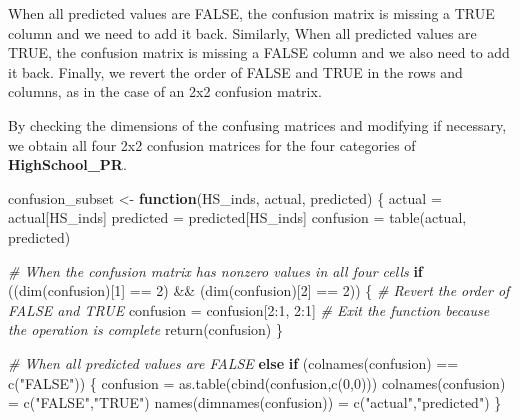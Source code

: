 \documentclass[
]{article}
\newenvironment{Shaded}{\begin{snugshade}}{\end{snugshade}}
\newcommand{\CommentTok}[1]{\textcolor[rgb]{0.56,0.35,0.01}{\textit{#1}}}
\newcommand{\ControlFlowTok}[1]{\textcolor[rgb]{0.13,0.29,0.53}{\textbf{#1}}}
\newcommand{\DecValTok}[1]{\textcolor[rgb]{0.00,0.00,0.81}{#1}}
\newcommand{\FunctionTok}[1]{\textcolor[rgb]{0.00,0.00,0.00}{#1}}
\newcommand{\NormalTok}[1]{#1}
\newcommand{\OtherTok}[1]{\textcolor[rgb]{0.56,0.35,0.01}{#1}}
\newcommand{\SpecialCharTok}[1]{\textcolor[rgb]{0.00,0.00,0.00}{#1}}
\newcommand{\StringTok}[1]{\textcolor[rgb]{0.31,0.60,0.02}{#1}}
\begin{document}
When all predicted values are FALSE, the confusion matrix is missing a
TRUE column and we need to add it back. Similarly, When all predicted
values are TRUE, the confusion matrix is missing a FALSE column and we
also need to add it back. Finally, we revert the order of FALSE and TRUE
in the rows and columns, as in the case of an 2x2 confusion matrix.

By checking the dimensions of the confusing matrices and modifying if
necessary, we obtain all four 2x2 confusion matrices for the four
categories of \textbf{HighSchool\_PR}.

\begin{Shaded}
\begin{Highlighting}[]
\NormalTok{confusion\_subset }\OtherTok{\textless{}{-}} \ControlFlowTok{function}\NormalTok{(HS\_inds, actual, predicted) \{}
\NormalTok{  actual }\OtherTok{=}\NormalTok{ actual[HS\_inds]}
\NormalTok{  predicted }\OtherTok{=}\NormalTok{ predicted[HS\_inds]}
\NormalTok{  confusion }\OtherTok{=} \FunctionTok{table}\NormalTok{(actual, predicted)}
  
  \CommentTok{\# When the confusion matrix has nonzero values in all four cells}
  \ControlFlowTok{if}\NormalTok{ ((}\FunctionTok{dim}\NormalTok{(confusion)[}\DecValTok{1}\NormalTok{] }\SpecialCharTok{==} \DecValTok{2}\NormalTok{) }\SpecialCharTok{\&\&}\NormalTok{ (}\FunctionTok{dim}\NormalTok{(confusion)[}\DecValTok{2}\NormalTok{] }\SpecialCharTok{==} \DecValTok{2}\NormalTok{)) \{}
    \CommentTok{\# Revert the order of FALSE and TRUE}
\NormalTok{    confusion }\OtherTok{=}\NormalTok{ confusion[}\DecValTok{2}\SpecialCharTok{:}\DecValTok{1}\NormalTok{, }\DecValTok{2}\SpecialCharTok{:}\DecValTok{1}\NormalTok{]}
    \CommentTok{\# Exit the function because the operation is complete}
    \FunctionTok{return}\NormalTok{(confusion)}
\NormalTok{  \}}
  
  \CommentTok{\# When all predicted values are FALSE}
  \ControlFlowTok{else} \ControlFlowTok{if}\NormalTok{ (}\FunctionTok{colnames}\NormalTok{(confusion) }\SpecialCharTok{==} \FunctionTok{c}\NormalTok{(}\StringTok{"FALSE"}\NormalTok{)) \{}
\NormalTok{    confusion }\OtherTok{=} \FunctionTok{as.table}\NormalTok{(}\FunctionTok{cbind}\NormalTok{(confusion,}\FunctionTok{c}\NormalTok{(}\DecValTok{0}\NormalTok{,}\DecValTok{0}\NormalTok{)))}
    \FunctionTok{colnames}\NormalTok{(confusion) }\OtherTok{=} \FunctionTok{c}\NormalTok{(}\StringTok{"FALSE"}\NormalTok{,}\StringTok{"TRUE"}\NormalTok{)}
    \FunctionTok{names}\NormalTok{(}\FunctionTok{dimnames}\NormalTok{(confusion)) }\OtherTok{=} \FunctionTok{c}\NormalTok{(}\StringTok{"actual"}\NormalTok{,}\StringTok{"predicted"}\NormalTok{)}
\NormalTok{  \}}
  

\end{Highlighting}
\end{Shaded}
\end{document}
